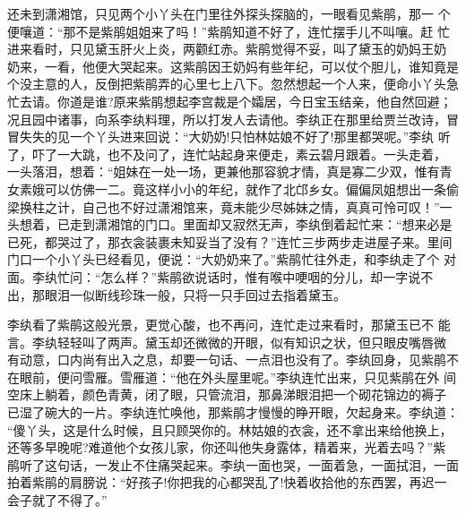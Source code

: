 还未到潇湘馆，只见两个小丫头在门里往外探头探脑的，一眼看见紫鹃，那一
个便嚷道：“那不是紫鹃姐姐来了吗！”紫鹃知道不好了，连忙摆手儿不叫嚷。赶
忙进来看时，只见黛玉肝火上炎，两颧红赤。紫鹃觉得不妥，叫了黛玉的奶妈王奶
奶来，一看，他便大哭起来。这紫鹃因王奶妈有些年纪，可以仗个胆儿，谁知竟是
个没主意的人，反倒把紫鹃弄的心里七上八下。忽然想起一个人来，便命小丫头急
忙去请。你道是谁?原来紫鹃想起李宫裁是个孀居，今日宝玉结亲，他自然回避；
况且园中诸事，向系李纨料理，所以打发人去请他。李纨正在那里给贾兰改诗，冒
冒失失的见一个丫头进来回说：“大奶奶!只怕林姑娘不好了!那里都哭呢。”李纨
听了，吓了一大跳，也不及问了，连忙站起身来便走，素云碧月跟着。一头走着，
一头落泪，想着：“姐妹在一处一场，更兼他那容貌才情，真是寡二少双，惟有青
女素娥可以仿佛一二。竟这样小小的年纪，就作了北邙乡女。偏偏凤姐想出一条偷
梁换柱之计，自己也不好过潇湘馆来，竟未能少尽姊妹之情，真真可怜可叹！”一
头想着，已走到潇湘馆的门口。里面却又寂然无声，李纨倒着起忙来：“想来必是
已死，都哭过了，那衣衾装裹未知妥当了没有？”连忙三步两步走进屋子来。里间
门口一个小丫头已经看见，便说：“大奶奶来了。”紫鹃忙往外走，和李纨走了个
对面。李纨忙问：“怎么样？”紫鹃欲说话时，惟有喉中哽咽的分儿，却一字说不
出，那眼泪一似断线珍珠一般，只将一只手回过去指着黛玉。

李纨看了紫鹃这般光景，更觉心酸，也不再问，连忙走过来看时，那黛玉已不
能言。李纨轻轻叫了两声。黛玉却还微微的开眼，似有知识之状，但只眼皮嘴唇微
有动意，口内尚有出入之息，却要一句话、一点泪也没有了。李纨回身，见紫鹃不
在眼前，便问雪雁。雪雁道：“他在外头屋里呢。”李纨连忙出来，只见紫鹃在外
间空床上躺着，颜色青黄，闭了眼，只管流泪，那鼻涕眼泪把一个砌花锦边的褥子
已湿了碗大的一片。李纨连忙唤他，那紫鹃才慢慢的睁开眼，欠起身来。李纨道：
“傻丫头，这是什么时候，且只顾哭你的。林姑娘的衣衾，还不拿出来给他换上，
还等多早晚呢?难道他个女孩儿家，你还叫他失身露体，精着来，光着去吗？”紫
鹃听了这句话，一发止不住痛哭起来。李纨一面也哭，一面着急，一面拭泪，一面
拍着紫鹃的肩膀说：“好孩子!你把我的心都哭乱了!快着收拾他的东西罢，再迟一
会子就了不得了。”

